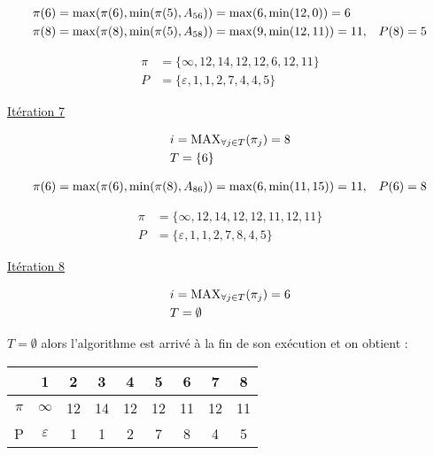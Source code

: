 \documentclass{article}
\begin{document}
\begin{align*}
  &\pi(6) = \operatorname{max}(\pi(6), \operatorname{min}(\pi(5), A_{56})) = \operatorname{max}(6, \operatorname{min}(12,0)) = 6\\
  &\pi(8) = \operatorname{max}(\pi(8), \operatorname{min}(\pi(5), A_{58})) = \operatorname{max}(9, \operatorname{min}(12,11)) = 11, &P(8) = 5
\end{align*}

\begin{align*}
  \pi &= \{\infty,12,14,12,12,6,12,11\}\\
  P &= \{\varepsilon, 1, 1, 2, 7, 4, 4, 5\}
\end{align*}

\underline{Itération 7}

\begin{align*}
  &i = \operatorname{MAX}_{\forall j \in T}(\pi_j) = 8\\
  &T = \{6\}
\end{align*}

\begin{align*}
  &\pi(6) = \operatorname{max}(\pi(6), \operatorname{min}(\pi(8), A_{86})) = \operatorname{max}(6, \operatorname{min}(11,15)) = 11, &P(6) = 8\\
\end{align*}

\begin{align*}
  \pi &= \{\infty,12,14,12,12,11,12,11\}\\
  P &= \{\varepsilon, 1, 1, 2, 7, 8, 4, 5\}
\end{align*}

\underline{Itération 8}

\begin{align*}
  &i = \operatorname{MAX}_{\forall j \in T}(\pi_j) = 6\\
  &T = \emptyset
\end{align*}

$T = \emptyset$ alors l'algorithme est arrivé à la fin de son
exécution et on obtient :

\begin{table}[H]

  \centering

  \begin{tabular}{c|cccccccc}
    
    & 1 & 2 & 3 & 4 & 5 & 6 & 7 & 8 \\
    \hline
    $\pi$ & $\infty$ & 12 & 14 & 12 & 12 & 11 & 12 & 11 \\
    P & $\varepsilon$ & 1 & 1 & 2 & 7 & 8 & 4 & 5 \\
  \end{tabular}

\end{table}
\end{document}
